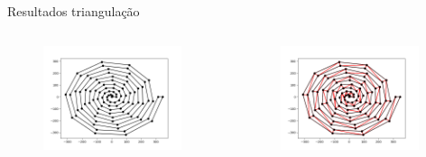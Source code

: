 \documentclass[aspectratio=169,usenames,dvipsnames]{beamer}
\begin{document}
\begin{frame}{Resultados triangulação}
  \begin{columns}
    \begin{center}
      \begin{figure}
        \includegraphics[width=0.95\textwidth]{figures/spiral_100.png}
      \end{figure}
    \end{center}
    \begin{center}
      \begin{figure}
        \includegraphics[width=0.95\textwidth]{figures/spiral_100_trig.png}
      \end{figure}
    \end{center}
  \end{columns}
\end{frame}
\end{document}

